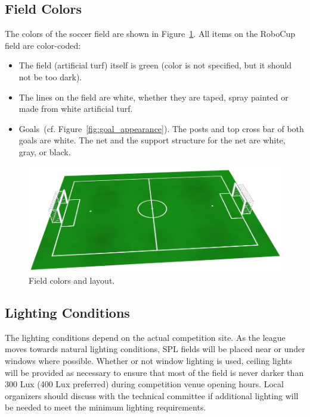 \documentclass[12pt]{article}
\newcommand{\cf}{\mbox{cf.}\xspace}
\begin{document}
\subsection{Field Colors}

The colors of the soccer field are shown in Figure~\ref{fig:field_color}. All items on the RoboCup field are color-coded:

\begin{itemize}

\item The field (artificial turf) itself is green (color is not specified, but it should not be too dark).

\item The lines on the field are white, whether they are taped, spray painted or made from white artificial turf.

\item Goals~(\cf Figure~\ref{fig:goal_appearance}). The posts and top cross bar of both goals are white. The net and the support structure for the net are white, gray, or black.

\end{itemize}

\begin{figure}[t]
\centerline{\includegraphics[width=\columnwidth]{figs/emptyfield_2015.png}}
\caption{Field colors and layout.}
\label{fig:field_color}
\end{figure}

\subsection{Lighting Conditions}
\label{sec:lightConditions}
The lighting conditions depend on the actual competition site. As the league moves towards natural lighting conditions, SPL fields will be placed near or under windows where possible. Whether or not window lighting is used, ceiling lights will be provided as necessary to ensure that most of the field is never darker than 300 Lux (400 Lux preferred) during competition venue opening hours. Local organizers should discuss with the technical committee if additional lighting will be needed to meet the minimum lighting requirements.
\end{document}
